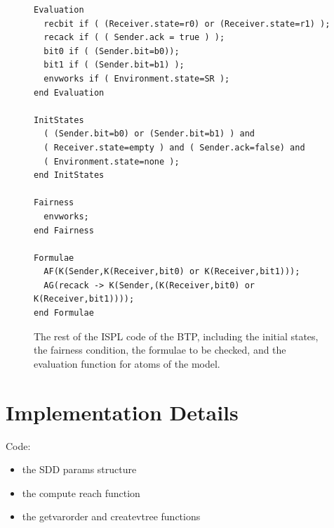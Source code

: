 \documentclass[11pt]{report}
\begin{document}
\begin{figure}
\begin{lstlisting}
Evaluation
  recbit if ( (Receiver.state=r0) or (Receiver.state=r1) );
  recack if ( ( Sender.ack = true ) );
  bit0 if ( (Sender.bit=b0));
  bit1 if ( (Sender.bit=b1) );
  envworks if ( Environment.state=SR );
end Evaluation

InitStates
  ( (Sender.bit=b0) or (Sender.bit=b1) ) and
  ( Receiver.state=empty ) and ( Sender.ack=false) and
  ( Environment.state=none );
end InitStates

Fairness
  envworks;
end Fairness

Formulae
  AF(K(Sender,K(Receiver,bit0) or K(Receiver,bit1)));
  AG(recack -> K(Sender,(K(Receiver,bit0) or K(Receiver,bit1))));
end Formulae
\end{lstlisting}
\caption{The rest of the ISPL code of the BTP, including the initial states, the fairness condition, the formulae to be checked, and the evaluation function for atoms of the model.}
\end{figure}


\chapter{Implementation Details}

Code:
\begin{itemize}
\item the SDD params structure
\item the compute reach function
\item the getvarorder and createvtree functions
\end{itemize}
\end{document}
